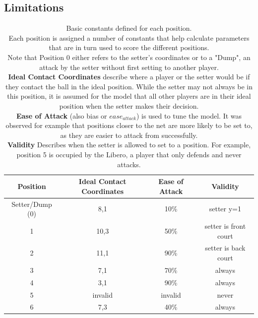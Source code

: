 \documentclass[main.tex]{subfiles}
\begin{document}
    \subsection{Limitations}

    

      
      \begin{table}[h!]
        \label{tab:positions}
        \centering
        \caption{Basic constants defined for each position. \\
          Each position is assigned a number of constants that help calculate parameters that are in turn used to score the different positions. \\
          Note that Position 0 either refers to the setter's coordinates or to a "Dump", an attack by the setter without first setting to another player. \\
          \textbf{Ideal Contact Coordinates} describe where a player or the setter would be if they contact the ball in the ideal position. While the setter may not always be in this position, it is assumed for the model that all other players are in their ideal position when the setter makes their decision. \\
          \textbf{Ease of Attack} (also bias or \(ease_{attack}\)) is used to tune the model. It was observed for example that positions closer to the net are more likely to be set to, as they are easier to attack from successfully. \\
          \textbf{Validity} Describes when the setter is allowed to set to a position. For example, position 5 is occupied by the Libero, a player that only defends and never attacks. 
          }
        \small
        \begin{tabular}{ c | c c c }
          \hline
          Position  & Ideal Contact Coordinates & Ease of Attack & Validity \\ \hline \hline
          Setter/Dump (0) &  8,1 & 10\% & setter y=1 \\
          1 & 10,3 & 50\% & setter is front court \\
          2 & 11,1 & 90\% & setter is back court \\
          3 & 7,1 & 70\% &  always \\
          4 & 3,1 & 90\% & always \\
          5 & invalid & invalid & never\\
          6 & 7,3 & 40\% & always \\
          \hline
        \end{tabular}
        \normalsize
      \end{table}
\end{document}
